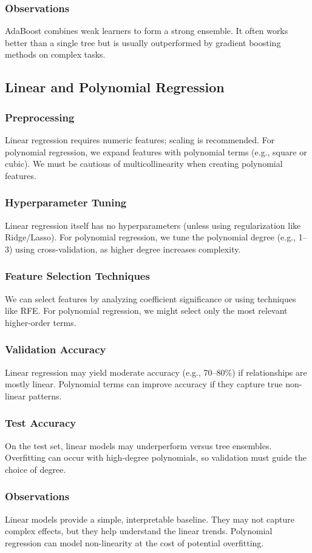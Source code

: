 \documentclass[12pt]{article}
\begin{document}
\subsubsection{Observations}
AdaBoost combines weak learners to form a strong ensemble. It often works better than a single tree but is usually outperformed by gradient boosting methods on complex tasks.

\subsection{Linear and Polynomial Regression}
\subsubsection{Preprocessing}
Linear regression requires numeric features; scaling is recommended. For polynomial regression, we expand features with polynomial terms (e.g., square or cubic). We must be cautious of multicollinearity when creating polynomial features.
\subsubsection{Hyperparameter Tuning}
Linear regression itself has no hyperparameters (unless using regularization like Ridge/Lasso). For polynomial regression, we tune the polynomial degree (e.g., 1--3) using cross-validation, as higher degree increases complexity.
\subsubsection{Feature Selection Techniques}
We can select features by analyzing coefficient significance or using techniques like RFE. For polynomial regression, we might select only the most relevant higher-order terms.
\subsubsection{Validation Accuracy}
Linear regression may yield moderate accuracy (e.g., 70--80\%) if relationships are mostly linear. Polynomial terms can improve accuracy if they capture true non-linear patterns.
\subsubsection{Test Accuracy}
On the test set, linear models may underperform versus tree ensembles. Overfitting can occur with high-degree polynomials, so validation must guide the choice of degree.
\subsubsection{Observations}
Linear models provide a simple, interpretable baseline. They may not capture complex effects, but they help understand the linear trends. Polynomial regression can model non-linearity at the cost of potential overfitting.
\end{document}
